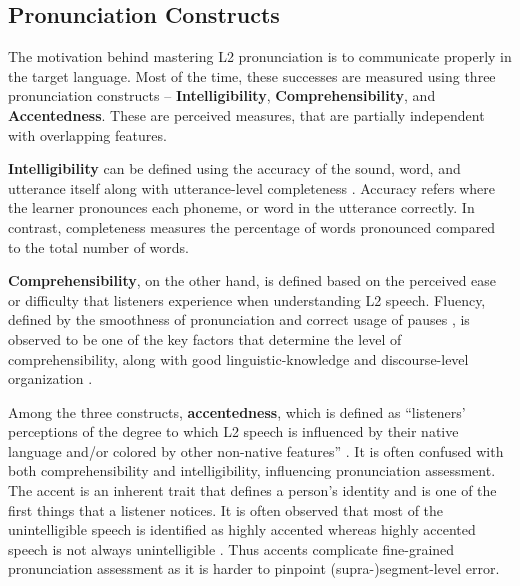 \documentclass[11pt]{article}
\begin{document}
\subsection{Pronunciation Constructs}
The motivation behind mastering L2 pronunciation is to communicate properly in the target language. Most of the time, these successes are measured using three pronunciation constructs \cite{uchihara2022possible} --  \textbf{Intelligibility}, \textbf{Comprehensibility}, and \textbf{Accentedness}. These are perceived measures, that are partially independent with overlapping features.

\textbf{Intelligibility} can be defined using the accuracy of the sound, word, and utterance itself along with utterance-level completeness \cite{abercrombie1949teaching,gooch2016effects}. 
Accuracy refers %
where the learner pronounces each phoneme, or word in the utterance correctly. In contrast, completeness measures the percentage of words pronounced compared to the total number of words.

\textbf{Comprehensibility}, on the other hand, is defined based on the perceived ease or difficulty that listeners experience when understanding L2 speech. Fluency, defined by the smoothness of pronunciation and correct usage of pauses \cite{speechocean762}, is observed to be one of the key factors that determine the level of comprehensibility, along with good linguistic-knowledge and discourse-level organization \cite{trofimovich2012disentangling, saito2016second}.  

Among the three constructs, \textbf{accentedness}, which is defined as ``listeners’ perceptions of the degree to which L2 speech is influenced by their native language and/or colored by other non-native features'' \cite{saito2016second}. It is often confused with both comprehensibility and intelligibility, influencing pronunciation assessment. The accent is an inherent trait that defines a person's identity and is one of the first things that a listener notices. It is often observed that most of the unintelligible speech is identified as highly accented whereas highly accented speech is not always unintelligible \cite{derwing1997accent, kang2018routledge, munro1995foreign}. Thus accents complicate fine-grained pronunciation assessment as it is harder to pinpoint (supra-)segment-level error. 
\end{document}
